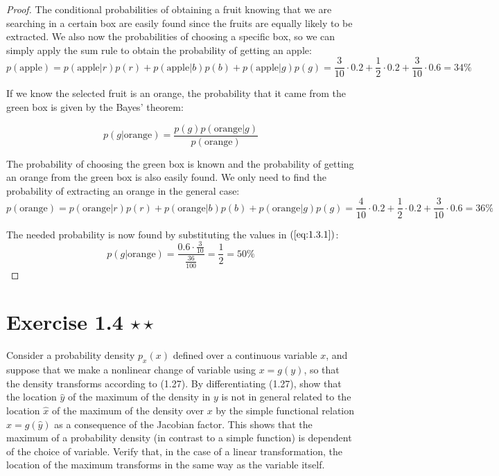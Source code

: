 \vspace{1em}

\begin{proof}
    The conditional probabilities of obtaining a fruit knowing that we are 
    searching in a certain box are easily found since the fruits are equally
    likely to be extracted. We also now the probabilities of choosing a specific box,
    so we can simply apply the sum rule to obtain the probability of getting an apple:
    \[
        p(\text{apple}) 
        = p(\text{apple} | r)p(r) + p(\text{apple} | b)p(b) + p(\text{apple} | g)p(g) 
        = \frac{3}{10} \cdot 0.2 + \frac{1}{2} \cdot 0.2 + \frac{3}{10} \cdot 0.6
        = 34\%
    \] 

    If we know the selected fruit is an orange, the probability that it came from
    the green box is given by the Bayes' theorem:

    \begin{equation*}
        p(g | \text{orange}) = \frac{p(g)p(\text{orange} | g)}{p(\text{orange})}
        \tag{1.3.1}\label{eq:1.3.1}
    \end{equation*}

    The probability of choosing the green box is known and the probability of getting
    an orange from the green box is also easily found. We only need to find the probability
    of extracting an orange in the general case:
    \[
        p(\text{orange}) 
        = p(\text{orange} | r)p(r) + p(\text{orange} | b)p(b) + p(\text{orange} | g)p(g) 
        = \frac{4}{10} \cdot 0.2 + \frac{1}{2} \cdot 0.2 + \frac{3}{10} \cdot 0.6
        = 36\%
    \]

    The needed probability is now found by substituting the values in $(\ref{eq:1.3.1})$:
    \[
        p(g | \text{orange}) = \frac{0.6 \cdot \frac{3}{10}}{\frac{36}{100}} = \frac{1}{2} = 50\%
    \] 
\end{proof}

\section*{Exercise 1.4 $\star \star$}
Consider a probability density $p_x(x)$ defined over a continuous variable
$x$, and suppose that we make a nonlinear change of variable using $x = g(y)$,
so that the density transforms according to (1.27). By differentiating (1.27),
show that the location  $\widehat{y}$ of the maximum of the density in
$y$ is not in general related to the location $\widehat{x}$ of the maximum of the
density over $x$ by the simple functional relation $\widehat{x} = g(\widehat{y})$ 
as a consequence of the Jacobian factor. This shows that the maximum of a probability
density (in contrast to a simple function) is dependent of the choice of variable.
Verify that, in the case of a linear transformation, the location of the maximum
transforms in the same way as the variable itself.

